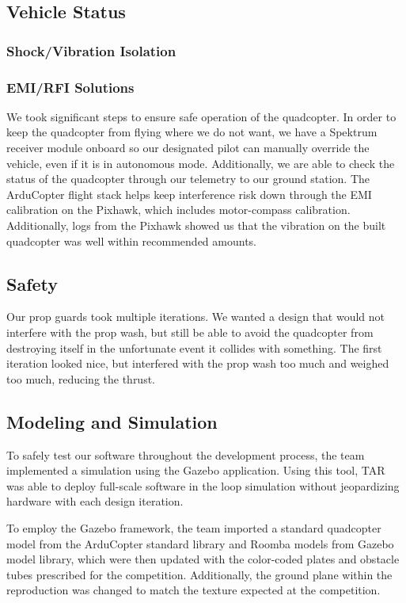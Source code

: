 \documentclass[12pt,letterpaper]{article}
\begin{document}
	\subsection*{Vehicle Status}
		\subsubsection*{Shock/Vibration Isolation}
		\subsubsection*{EMI/RFI Solutions}
		We took significant steps to ensure safe operation of the quadcopter. In order to keep the quadcopter from flying where we do not want, we have a Spektrum receiver module onboard so our designated pilot can manually override the vehicle, even if it is in autonomous mode. Additionally, we are able to check the status of the quadcopter through our telemetry to our ground station. The ArduCopter flight stack helps keep interference risk down through the EMI calibration on the Pixhawk, which includes motor-compass calibration. Additionally, logs from the Pixhawk showed us that the vibration on the built quadcopter was well within recommended amounts.

	\subsection*{Safety}
		Our prop guards took multiple iterations. We wanted a design that would not interfere with the prop wash, but still be able to avoid the quadcopter from destroying itself in the unfortunate event it collides with something. The first iteration looked nice, but interfered with the prop wash too much and weighed too much, reducing the thrust.

	\subsection*{Modeling and Simulation}

		To safely test our software throughout the development process, the team implemented a simulation using the Gazebo application. Using this tool, TAR was able to deploy full-scale software in the loop simulation without jeopardizing hardware with each design iteration.

		To employ the Gazebo framework, the team imported a standard quadcopter model from the ArduCopter standard library and Roomba models from Gazebo model library, which were then updated with the color-coded plates and obstacle tubes prescribed for the competition. Additionally, the ground plane within the reproduction was changed to match the texture expected at the competition.
\end{document}
